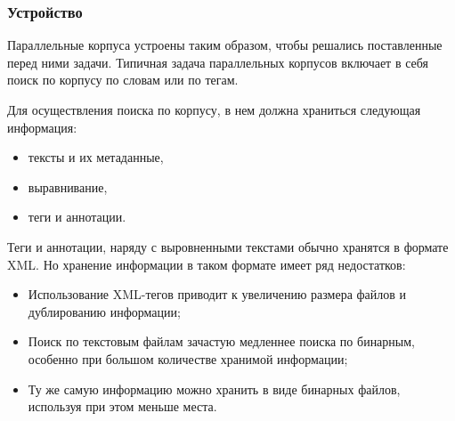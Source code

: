 
\subsubsection{Устройство}

Параллельные корпуса устроены таким образом, чтобы решались поставленные перед ними задачи.
Типичная задача параллельных корпусов включает в себя поиск по корпусу по словам или по тегам.

Для осуществления поиска по корпусу, в нем должна храниться следующая информация:
\begin{itemize}
    \item тексты и их метаданные,
    \item выравнивание,
    \item теги и аннотации.
\end{itemize}

Теги и аннотации, наряду с выровненными текстами обычно \cite{cl, survey, ruscorpora, opencorpora} хранятся в формате XML.
Но хранение информации в таком формате имеет ряд недостатков:
\begin{itemize}
    \item Использование XML-тегов приводит к увеличению размера файлов и дублированию информации;
    \item Поиск по текстовым файлам зачастую медленнее поиска по бинарным, особенно при большом количестве хранимой информации;
    \item Ту же самую информацию можно хранить в виде бинарных файлов, используя при этом меньше места.
\end{itemize}

